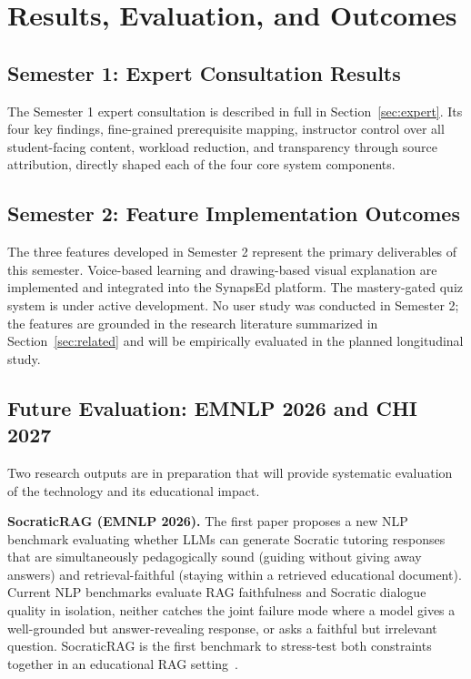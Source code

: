 \documentclass{stylefiles/capstone}
\begin{document}
\section{Results, Evaluation, and Outcomes}

\subsection{Semester 1: Expert Consultation Results}

The Semester 1 expert consultation is described in full in Section~\ref{sec:expert}. Its four key findings, fine-grained prerequisite mapping, instructor control over all student-facing content, workload reduction, and transparency through source attribution, directly shaped each of the four core system components.

\subsection{Semester 2: Feature Implementation Outcomes}

The three features developed in Semester 2 represent the primary deliverables of this semester. Voice-based learning and drawing-based visual explanation are implemented and integrated into the SynapsEd platform. The mastery-gated quiz system is under active development. No user study was conducted in Semester 2; the features are grounded in the research literature summarized in Section~\ref{sec:related} and will be empirically evaluated in the planned longitudinal study.

\subsection{Future Evaluation: EMNLP 2026 and CHI 2027}

Two research outputs are in preparation that will provide systematic evaluation of the technology and its educational impact.

\textbf{SocraticRAG (EMNLP 2026).} The first paper proposes a new NLP benchmark evaluating whether LLMs can generate Socratic tutoring responses that are simultaneously pedagogically sound (guiding without giving away answers) and retrieval-faithful (staying within a retrieved educational document). Current NLP benchmarks evaluate RAG faithfulness and Socratic dialogue quality in isolation, neither catches the joint failure mode where a model gives a well-grounded but answer-revealing response, or asks a faithful but irrelevant question. SocraticRAG is the first benchmark to stress-test both constraints together in an educational RAG setting~\cite{macina2025mathtutorbench,bonino2024euler,liu2024socraticlm}.
\end{document}
